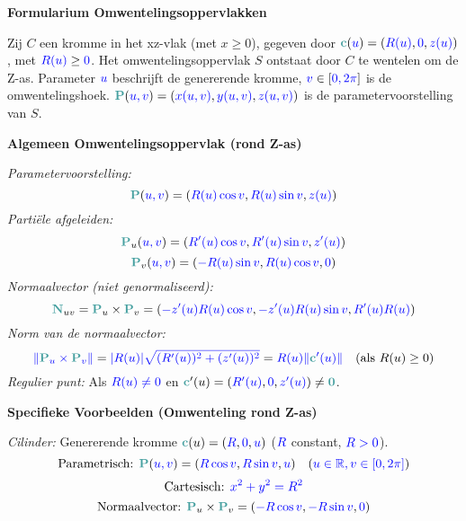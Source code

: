 \documentclass[12pt]{article}
\renewcommand{\vec}[1]{\textcolor{vectorTeal}{\mathbf{#1}}}
\newcommand{\scalar}[1]{\textcolor{scalarBrightBlue}{#1}}
\begin{document}
\begin{center}
\Large \textbf{Formularium Omwentelingsoppervlakken}
\end{center}

\vspace{1em} %

Zij $C$ een kromme in het xz-vlak (met $x \ge 0$), gegeven door $\vec{c}(\scalar{u}) = (\scalar{R(u)}, \scalar{0}, \scalar{z(u)})$, met $\scalar{R(u)} \ge \scalar{0}$.
Het omwentelingsoppervlak $S$ ontstaat door $C$ te wentelen om de Z-as.
Parameter $\scalar{u}$ beschrijft de genererende kromme, $\scalar{v} \in [\scalar{0, 2\pi}]$ is de omwentelingshoek.
$\vec{P}(\scalar{u, v}) = (\scalar{x(u,v)}, \scalar{y(u,v)}, \scalar{z(u,v)})$ is de parametervoorstelling van $S$.

\vspace{1.5em} %
{\centering
\textcolor{headerBrown}{\large\textbf{Algemeen Omwentelingsoppervlak (rond Z-as)}}
\par
}%
\textit{Parametervoorstelling:}
\[
\vec{P}(\scalar{u, v}) = (\scalar{R(u) \cos v}, \scalar{R(u) \sin v}, \scalar{z(u)})
\]
\textit{Partiële afgeleiden:}
\[
\vec{P}_u(\scalar{u, v}) = (\scalar{R'(u) \cos v}, \scalar{R'(u) \sin v}, \scalar{z'(u)})
\]
\[
\vec{P}_v(\scalar{u, v}) = (\scalar{-R(u) \sin v}, \scalar{R(u) \cos v}, \scalar{0})
\]
\textit{Normaalvector (niet genormaliseerd):}
\[
\vec{N}_{uv} = \vec{P}_u \times \vec{P}_v = (\scalar{-z'(u) R(u) \cos v}, \scalar{-z'(u) R(u) \sin v}, \scalar{R'(u) R(u)})
\]
\textit{Norm van de normaalvector:}
\[
\scalar{\|\vec{P}_u \times \vec{P}_v\|} = \scalar{|R(u)| \sqrt{(R'(u))^2 + (z'(u))^2}} = \scalar{R(u) \|\vec{c}'(u)\|} \quad (\text{als } R(u) \ge 0)
\]
\textit{Regulier punt:} Als $\scalar{R(u) \neq 0}$ en $\vec{c}'(u) = (\scalar{R'(u)}, \scalar{0}, \scalar{z'(u)}) \neq \vec{0}$.

\vspace{1.5em} %
{\centering
\textcolor{headerBrown}{\large\textbf{Specifieke Voorbeelden (Omwenteling rond Z-as)}}
\par
}%
\textit{Cilinder:} Genererende kromme $\vec{c}(u) = (\scalar{R}, \scalar{0}, \scalar{u})$ ($\scalar{R}$ constant, $\scalar{R>0}$).
\[
\text{Parametrisch: } \vec{P}(\scalar{u, v}) = (\scalar{R \cos v}, \scalar{R \sin v}, \scalar{u}) \quad (\scalar{u \in \mathbb{R}, v \in [0, 2\pi]})
\]
\[
\text{Cartesisch: } \scalar{x^2 + y^2 = R^2}
\]
\[
\text{Normaalvector: } \vec{P}_u \times \vec{P}_v = (\scalar{-R \cos v}, \scalar{-R \sin v}, \scalar{0})
\]
\end{document}
